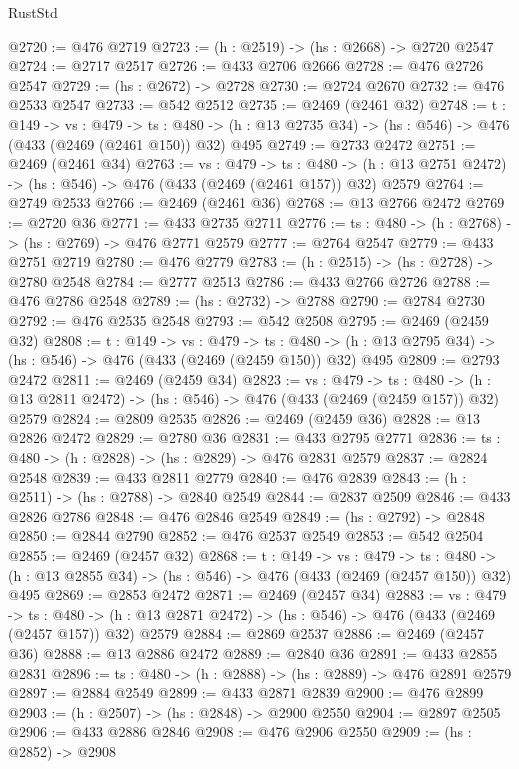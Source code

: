 \begin{lexlean}{RustStd}
\begin{coremodule}
@2720 := @476 @2719
@2723 := (h : @2519) -> (hs : @2668) -> @2720 @2547
@2724 := @2717 @2517
@2726 := @433 @2706 @2666
@2728 := @476 @2726 @2547
@2729 := (hs : @2672) -> @2728
@2730 := @2724 @2670
@2732 := @476 @2533 @2547
@2733 := @542 @2512
@2735 := @2469 (@2461 @32)
@2748 := {t : @149} ->
  {vs : @479} ->
  {ts : @480} -> (h : @13 @2735 @34) -> (hs : @546) -> @476 (@433 (@2469 (@2461 @150)) @32) @495
@2749 := @2733 @2472
@2751 := @2469 (@2461 @34)
@2763 := {vs : @479} ->
  {ts : @480} -> (h : @13 @2751 @2472) -> (hs : @546) -> @476 (@433 (@2469 (@2461 @157)) @32) @2579
@2764 := @2749 @2533
@2766 := @2469 (@2461 @36)
@2768 := @13 @2766 @2472
@2769 := @2720 @36
@2771 := @433 @2735 @2711
@2776 := {ts : @480} -> (h : @2768) -> (hs : @2769) -> @476 @2771 @2579
@2777 := @2764 @2547
@2779 := @433 @2751 @2719
@2780 := @476 @2779
@2783 := (h : @2515) -> (hs : @2728) -> @2780 @2548
@2784 := @2777 @2513
@2786 := @433 @2766 @2726
@2788 := @476 @2786 @2548
@2789 := (hs : @2732) -> @2788
@2790 := @2784 @2730
@2792 := @476 @2535 @2548
@2793 := @542 @2508
@2795 := @2469 (@2459 @32)
@2808 := {t : @149} ->
  {vs : @479} ->
  {ts : @480} -> (h : @13 @2795 @34) -> (hs : @546) -> @476 (@433 (@2469 (@2459 @150)) @32) @495
@2809 := @2793 @2472
@2811 := @2469 (@2459 @34)
@2823 := {vs : @479} ->
  {ts : @480} -> (h : @13 @2811 @2472) -> (hs : @546) -> @476 (@433 (@2469 (@2459 @157)) @32) @2579
@2824 := @2809 @2535
@2826 := @2469 (@2459 @36)
@2828 := @13 @2826 @2472
@2829 := @2780 @36
@2831 := @433 @2795 @2771
@2836 := {ts : @480} -> (h : @2828) -> (hs : @2829) -> @476 @2831 @2579
@2837 := @2824 @2548
@2839 := @433 @2811 @2779
@2840 := @476 @2839
@2843 := (h : @2511) -> (hs : @2788) -> @2840 @2549
@2844 := @2837 @2509
@2846 := @433 @2826 @2786
@2848 := @476 @2846 @2549
@2849 := (hs : @2792) -> @2848
@2850 := @2844 @2790
@2852 := @476 @2537 @2549
@2853 := @542 @2504
@2855 := @2469 (@2457 @32)
@2868 := {t : @149} ->
  {vs : @479} ->
  {ts : @480} -> (h : @13 @2855 @34) -> (hs : @546) -> @476 (@433 (@2469 (@2457 @150)) @32) @495
@2869 := @2853 @2472
@2871 := @2469 (@2457 @34)
@2883 := {vs : @479} ->
  {ts : @480} -> (h : @13 @2871 @2472) -> (hs : @546) -> @476 (@433 (@2469 (@2457 @157)) @32) @2579
@2884 := @2869 @2537
@2886 := @2469 (@2457 @36)
@2888 := @13 @2886 @2472
@2889 := @2840 @36
@2891 := @433 @2855 @2831
@2896 := {ts : @480} -> (h : @2888) -> (hs : @2889) -> @476 @2891 @2579
@2897 := @2884 @2549
@2899 := @433 @2871 @2839
@2900 := @476 @2899
@2903 := (h : @2507) -> (hs : @2848) -> @2900 @2550
@2904 := @2897 @2505
@2906 := @433 @2886 @2846
@2908 := @476 @2906 @2550
@2909 := (hs : @2852) -> @2908

\end{coremodule}
\end{lexlean}
